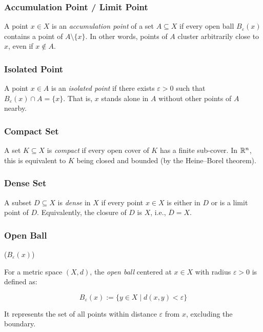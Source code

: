\subsubsection{Accumulation Point / Limit Point}

A point \( x \in X \) is an \emph{accumulation point} of a set \( A \subseteq X \)
if every open ball \( B_\varepsilon(x) \) contains a point of \( A \setminus \{x\} \). 
In other words, points of \( A \) cluster arbitrarily close to 
\( x \), even if \( x \notin A \).

\subsubsection{Isolated Point} 
	      
A point \( x \in A \) is an \emph{isolated point} if there exists \( \varepsilon > 0 \)
such that \( B_\varepsilon(x) \cap A = \{x\} \). 
That is, \( x \) stands alone in \( A \) without other points of \( A \) nearby.

\subsubsection{Compact Set} 

A set \( K \subseteq X \) is \emph{compact} if every open cover of \( K \) has a finite sub-cover. 
In \(\mathbb{R}^n\), this is equivalent to \( K \) being closed and bounded (by the Heine–Borel theorem).

\subsubsection{Dense Set} 
	      
A subset \( D \subseteq X \) is \emph{dense} in \( X \) if every point 
\( x \in X \) is either in \( D \) or is a limit point of \( D \). 
Equivalently, the closure of \( D \) is \( X \), i.e., \( \overline{D} = X \).

\subsubsection{Open Ball} (\( B_\varepsilon(x) \)) 

For a metric space \( (X, d) \), the \emph{open ball} centered at 
\( x \in X \) with radius \( \varepsilon > 0 \) is defined as: 
	      
\[
	B_\varepsilon(x) := \{ y \in X \mid d(x, y) < \varepsilon \}
\]

It represents the set of all points within distance \( \varepsilon \) from \( x \), excluding the boundary.

